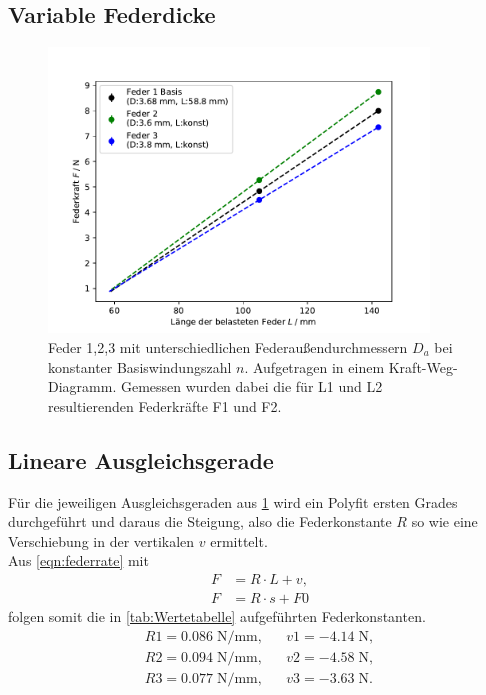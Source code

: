 \subsection{Variable Federdicke}
\begin{figure}[H]
    \center
    \includegraphics[width=0.9\textwidth]{plots/D_kraftweg_dia.pdf}
    \caption{Feder 1,2,3 mit unterschiedlichen Federaußendurchmessern $D_a$ bei konstanter Basiswindungszahl $n$.
    Aufgetragen in einem Kraft-Weg-Diagramm. Gemessen wurden dabei
    die für L1 und L2 resultierenden Federkräfte F1 und F2.}
    \label{tab:LF_D}
\end{figure}
\subsection{Lineare Ausgleichsgerade}
\label{sec:fit}
Für die jeweiligen Ausgleichsgeraden aus \ref{tab:LF_D} wird ein Polyfit \cite{numpy_polyfit}
ersten Grades durchgeführt und daraus die Steigung, also die Federkonstante $R$ so wie eine Verschiebung
in der vertikalen $v$ ermittelt.\\
Aus \ref{eqn:federrate} mit
\begin{align*}
  F&=R \cdot L + v ,\\
  F&=R \cdot s + F0
\end{align*}
folgen somit die in \ref{tab:Wertetabelle} aufgeführten Federkonstanten.
\begin{align*}
  R1= 0.086\;\si{\N\per\mm}, &&  v1= -4.14\;\si{\N},\\
  R2= 0.094\;\si{\N\per\mm}, &&  v2= -4.58\;\si{\N},\\
  R3= 0.077\;\si{\N\per\mm}, &&  v3= -3.63\;\si{\N}.\\
\end{align*}

